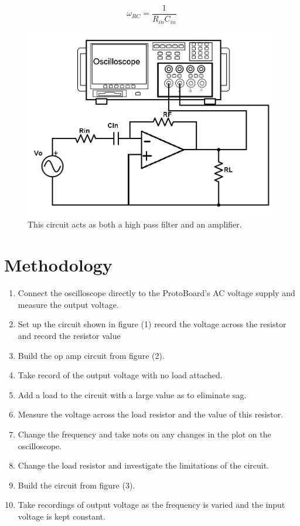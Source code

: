 \documentclass[twocolumn, amsmath]{revtex4}
\begin{document}
\begin{equation}
\omega_{RC} =  \frac{1}{R_{in}C_{in}}
\end{equation}


\begin{figure}[h]
    \includegraphics[scale=0.3]{highpassamp.png}  
    \caption{This circuit acts as both a high pass filter and an amplifier.}
\end{figure}


\section{Methodology}

\begin{enumerate}
    \item Connect the oscilloscope directly to the ProtoBoard's AC voltage supply and measure the output voltage.
    \item Set up the circuit shown in figure (1) record the voltage across the resistor and record the resistor value
    \item Build the op amp circuit from figure (2).
    \item Take record of the output voltage with no load attached.
    \item Add a load to the circuit with a large value as to eliminate sag.
    \item Measure the voltage across the load resistor and the value of this resistor.
    \item Change the frequency and take nots on any changes in the plot on the oscilloscope.
    \item Change the load resistor and investigate the limitations of the circuit.
    \item Build the circuit from figure (3).
    \item Take recordings of output voltage as the frequency is varied and the input voltage is kept constant.
\end{enumerate}
\end{document}
